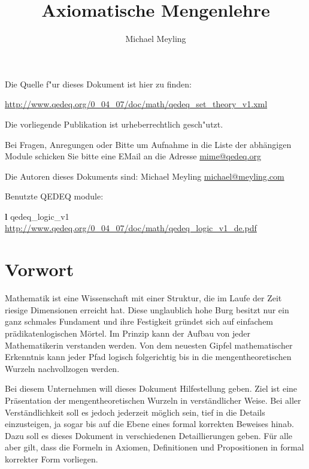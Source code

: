 \documentclass[a4paper,german,10pt,twoside]{book}
\title{Axiomatische Mengenlehre}
\author{
Michael Meyling
}
\theoremstyle{definition}
\theoremstyle{remark}
\begin{document}
\maketitle

\setlength{\parskip}{5pt plus 2pt minus 1pt}
\mbox{}
\vfill

\par
Die Quelle f{"ur} dieses Dokument ist hier zu finden:
\par
\url{http://www.qedeq.org/0_04_07/doc/math/qedeq_set_theory_v1.xml}

\par
Die vorliegende Publikation ist urheberrechtlich gesch{"u}tzt.
\par
Bei Fragen, Anregungen oder Bitte um Aufnahme in die Liste der abh{\"a}ngigen Module schicken Sie bitte eine EMail an die Adresse \href{mailto:mime@qedeq.org}{mime@qedeq.org}

\par
Die Autoren dieses Dokuments sind:
Michael Meyling \href{mailto:michael@meyling.com}{michael@meyling.com}



\par
Benutzte QEDEQ module:

\par


\par
\textbf{l} qedeq\_logic\_v1 \url{http://www.qedeq.org/0_04_07/doc/math/qedeq_logic_v1_de.pdf}


\setlength{\parskip}{0pt}
\tableofcontents

\setlength{\parskip}{5pt plus 2pt minus 1pt}

\chapter*{Vorwort\label{ch:preface}} \label{chapter1} \hypertarget{chapter1}{}

Mathematik ist eine Wissenschaft mit einer Struktur, die im Laufe der Zeit riesige Dimensionen erreicht hat. Diese unglaublich hohe Burg besitzt nur ein ganz schmales Fundament und ihre Festigkeit gr{\"u}ndet sich auf einfachem pr{\"a}dikatenlogischen M{\"o}rtel. Im Prinzip kann der Aufbau von jeder Mathematikerin verstanden werden. Von dem neuesten Gipfel mathematischer Erkenntnis kann jeder Pfad logisch folgerichtig bis in die mengentheoretischen Wurzeln nachvollzogen werden.

\par
Bei diesem Unternehmen will dieses Dokument Hilfestellung geben. Ziel ist eine Pr{\"a}sentation der mengentheoretischen Wurzeln in verst{\"a}ndlicher Weise. Bei aller Verst{\"a}ndlichkeit soll es jedoch jederzeit m{\"o}glich sein, tief in die Details einzusteigen, ja sogar bis auf die Ebene eines formal korrekten Beweises hinab. Dazu soll es dieses Dokument in verschiedenen Detaillierungen geben. F{\"u}r alle aber gilt, dass die Formeln in Axiomen, Definitionen und Propositionen in formal korrekter Form vorliegen.
\end{document}
